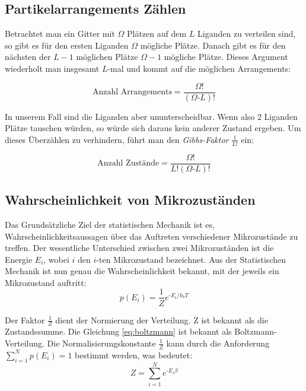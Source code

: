 \documentclass[bachelor,       %
               twoside,        %
               BCOR10mm,       %
               english,ngerman, %
               ]{GAUBM}
\begin{document}
\subsection{Partikelarrangements Zählen}

Betrachtet man ein Gitter mit $\Omega$ Plätzen auf dem $L$ Liganden zu verteilen
sind, so gibt es für den ersten Liganden $\Omega$ mögliche Plätze. Danach gibt es
für den nächsten der $L - 1$ möglichen Plätze $\Omega - 1$ mögliche Plätze.
Dieses Argument wiederholt man insgesamt $L$-mal und kommt auf die möglichen Arrangements:

\begin{equation}
\text{Anzahl Arrangements} = \frac{\Omega!}{(\Omega\text{-}L)!}
\end{equation}

In unserem Fall sind die Liganden aber ununterscheidbar. Wenn also 2 Liganden
Plätze tauschen würden, so würde sich daraus kein anderer Zustand ergeben. Um
dieses Überzählen zu verhindern, führt man den \emph{Gibbs-Faktor} $\frac{1}{L!}$
ein:

\begin{equation}
\label{zustaende}
\text{Anzahl Zustände} = \frac{\Omega!}{L!(\Omega\text{-}L)!}
\end{equation}

\subsection{Wahrscheinlichkeit von Mikrozuständen}
Das Grundsätzliche Ziel der statistischen Mechanik ist es, Wahrscheinlichkeitsaussagen
über das Auftreten verschiedener Mikrozustände zu treffen. Der wesentliche Unterschied
zwischen zwei Mikrozuständen ist die Energie $E_i$, wobei $i$ den $i$-ten Mikrozustand
bezeichnet. Aus der Statistischen Mechanik ist nun genau die Wahrscheinlichkeit
bekannt, mit der jeweils ein Mikrozustand auftritt:
\begin{equation}
  \label{eq:boltzmann}
  p(E_i) = \frac{1}{Z} e^{\text{-}E_i\text{/}k_bT}
\end{equation}

Der Faktor $\frac{1}{Z}$ dient der Normierung der Verteilung.
Z ist bekannt als die Zustandssumme. Die Gleichung \ref{eq:boltzmann}
ist bekannt als Boltzmann-Verteilung. Die Normalisierungskonstante $\frac{1}{Z}$
kann durch die Anforderung $ \sum_{i=1}^{N} p(E_i) = 1$ bestimmt werden, was bedeutet:
\begin{equation}
Z = \sum_{i=1}^{N}e^{\text{-}E_i\beta}
\end{equation}
\end{document}
